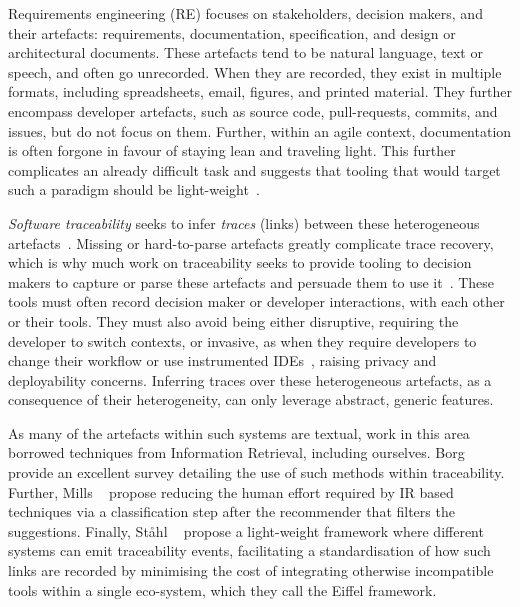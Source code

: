 Requirements engineering (RE) focuses on stakeholders, decision makers, and
their artefacts: requirements, documentation, specification, and design or
architectural documents. These artefacts tend to be natural language, text or
speech, and often go unrecorded. When they are recorded, they exist in multiple
formats, including spreadsheets, email, figures, and printed material. They
further encompass developer artefacts, such as source code, pull-requests,
commits, and issues, but do not focus on them. Further, within an agile context,
documentation is often forgone in favour of staying lean and traveling light.
This further complicates an already difficult task and suggests that tooling
that would target such a paradigm should be light-weight~\cite{Stahl2017}.

\emph{Software traceability} seeks to infer \emph{traces} (\ie links) between
these heterogeneous artefacts~\cite{Cleland-Huang2014}. Missing or hard-to-parse
artefacts greatly complicate trace recovery, which is why much work on
traceability seeks to provide tooling to decision makers to capture or parse
these artefacts and persuade them to use it~\cite{Neumuller06, jiralinkdoc,
ghlinkdoc}. These tools must often record decision maker or developer
interactions, with each other or their tools. They must also avoid being either
disruptive, requiring the developer to switch contexts, or invasive, as when
they require developers to change their workflow or use instrumented
IDEs~\cite{TopicTraceability}, raising privacy and deployability concerns.
Inferring traces over these heterogeneous artefacts, as a consequence of their
heterogeneity, can only leverage abstract, generic features. 

As many of the artefacts within such systems are textual, work in this area
borrowed techniques from Information Retrieval, including ourselves. Borg
\etal~\cite{Borg2014} provide an excellent survey detailing the use of such
methods within traceability. Further, Mills
\etal~\cite{Mills:2017:ATL:3106237.3121280} propose reducing the human effort
required by IR based techniques via a classification step after the recommender
that filters the suggestions. Finally, St{\aa}hl \etal~\cite{Stahl2017} propose
a light-weight framework where different systems can emit traceability events,
facilitating a standardisation of how such links are recorded by minimising the
cost of integrating otherwise incompatible tools within a single eco-system,
which they call the Eiffel framework.

